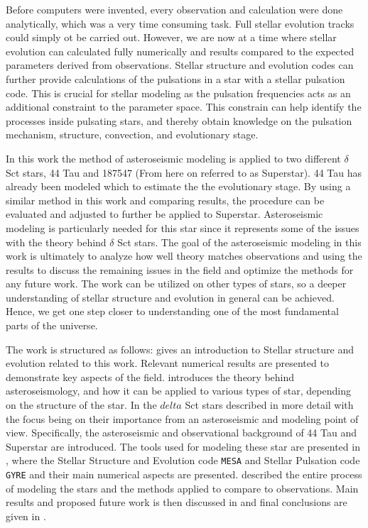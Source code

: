 Before computers were invented, every observation and calculation were done analytically, which was a very time consuming task. Full stellar evolution tracks could simply ot be carried out. However, we are now at a time where stellar evolution can calculated fully numerically and results compared to the expected parameters derived from observations. Stellar structure and evolution codes can further provide calculations of the pulsations in a star with a stellar pulsation code. This is crucial for stellar modeling as the pulsation frequencies acts as an additional constraint to the parameter space. This constrain can help identify the processes inside pulsating stars, and thereby obtain knowledge on the pulsation mechanism, structure, convection, and evolutionary stage. 

In this work the method of asteroseismic modeling is applied to two different $\delta$ Sct stars, 44 Tau and 187547 (From here on referred to as Superstar). 44 Tau has already been modeled which to estimate the the evolutionary stage. By using a similar method in this work and comparing results, the procedure can be evaluated and adjusted to further be applied to Superstar. Asteroseismic modeling is particularly needed for this star since it represents some of the issues with the theory behind $\delta$ Sct stars. The goal of the asteroseismic modeling in this work is ultimately to analyze how well theory matches observations and using the results to discuss the remaining issues in the field and optimize the methods for any future work.  The work can be utilized on other types of stars, so a deeper understanding of stellar structure and evolution in general can be achieved. Hence, we get one step closer to understanding one of the most fundamental parts of the universe. 

 The work is structured as follows:  gives an introduction to Stellar structure and evolution related to  this work. Relevant numerical results are presented to demonstrate key aspects of the field.  introduces the theory behind asteroseismology, and how it can be applied to various types of star, depending on the structure of the star. In  the $delta$ Sct stars described in more detail with the focus being on their importance from an asteroseismic and modeling point of view. Specifically, the asteroseismic and observational background of 44 Tau and Superstar are introduced. The tools used for modeling these star are presented in , where the Stellar Structure and Evolution code \texttt{MESA} and Stellar Pulsation code \texttt{GYRE} and their main numerical aspects are presented.  described the entire process of modeling the stars and the methods applied to compare to observations. Main results and proposed future work is then discussed in  and final conclusions are given in .

